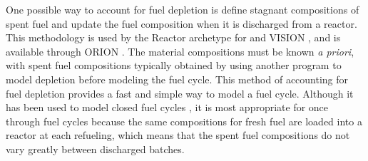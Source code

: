 One possible way to account for fuel depletion is define stagnant 
compositions of spent fuel and update the fuel composition when 
it is discharged from a reactor. This methodology is used by the 
\Cycamore Reactor archetype for \Cyclus \cite{carlsen_cycamore_2014}
and \gls{VISION} \cite{yacout_vision_2006},
and is available through ORION \cite{sunny_transition_2015}. The 
material compositions must be known \textit{a priori}, with spent fuel 
compositions typically obtained by using another program 
to model depletion before modeling the fuel cycle. 
This method of accounting for fuel depletion provides a fast and 
simple way to model a fuel cycle. Although it has been used to 
model closed fuel cycles \cite{bae_standardized_2019,djokic_application_2015},
it is most appropriate for once through fuel cycles 
\cite{sunny_transition_2015} because the same 
compositions for fresh fuel are loaded into a reactor at each 
refueling, which means that the spent fuel compositions do not vary 
greatly between discharged batches. 

